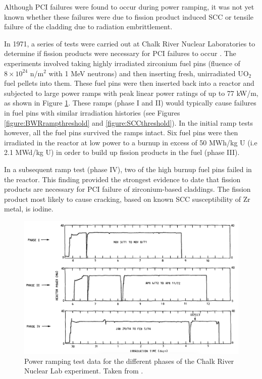 Although PCI failures were found to occur during power ramping, it was not yet known whether these failures were due to fission product induced SCC or tensile failure of the cladding due to radiation embrittlement. 

In 1971, a series of tests were carried out at Chalk River Nuclear Laboratories to determine if fission products were necessary for PCI failures to occur \cite{MacDonald1979}. The experiments involved taking highly irradiated zirconium fuel pins (fluence of $8 \times 10^{24}$ n/m$^{2}$ with 1 MeV neutrons) and then inserting fresh, unirradiated UO$_{2}$ fuel pellets into them. These fuel pins were then inserted back into a reactor and subjected to large power ramps with peak linear power ratings of up to 77 kW/m, as shown in Figure \ref{figure:fueltests}. These ramps (phase I and II) would typically cause failures in fuel pins with similar irradiation histories (see Figures \ref{figure:BWRrampthreshold} and \ref{figure:SCCthreshold}). In the initial ramp tests however, all the fuel pins survived the ramps intact. Six fuel pins were then irradiated in the reactor at low power to a burnup in excess of 50 MWh/kg U (i.e 2.1 MWd/kg U) in order to build up fission products in the fuel (phase III). 

In a subsequent ramp test (phase IV), two of the high burnup fuel pins failed in the reactor. This finding provided the strongest evidence to date that fission products are necessary for PCI failure of zirconium-based claddings. The fission product most likely to cause cracking, based on known SCC susceptibility of Zr metal, is iodine.

\begin{landscape} %
\begin{figure}[ht]
\centering
\includegraphics[width=\linewidth]{images/fueltests.png}
\caption[Power ramping test data for the different phases of the Chalk River Nuclear Lab experiment.]{Power ramping test data for the different phases of the Chalk River Nuclear Lab experiment. Taken from \cite{MacDonald1979}.}
\label{figure:fueltests}
\end{figure}
\end{landscape}

